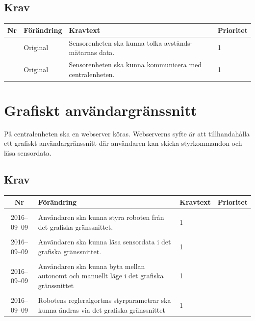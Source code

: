 \documentclass[a4paper,titlepage,12pt]{article}
\newcounter{reqNr}
\newcommand{\nextReqNr}{\stepcounter{reqNr}\arabic{reqNr}}
\newcounter{reqNrII}
\newcommand{\nextReqNrII}{\stepcounter{reqNrII}\arabic{reqNrII}}
\newcommand{\newRequirement}[1] {\pbox{5cm}{Tillagt \\#1}}
\begin{document}
	\subsection{Krav}
	\begin{longtable}[c]{ c l>{\raggedright}p{} l }
		\textbf{Nr} & \textbf{Förändring} & \textbf{Kravtext} & \textbf{Prioritet} 
			\\ \midrule

		\nextReqNr{} & Original & Sensorenheten ska kunna tolka avstånds- mätarnas data. & 1
			\\ \midrule

		\nextReqNr{} & Original & Sensorenheten ska kunna kommunicera med 
			centralenheten. & 1

	\end{longtable}

    \section{Grafiskt användargränssnitt}
    På centralenheten ska en webserver köras. Webserverns syfte är att
    tillhandahålla ett grafiskt användargränssnitt där användaren kan skicka
    styrkommandon och läsa sensordata.
	\subsection{Krav}
	\begin{longtable}[c]{ c l>{\raggedright}p{} l }
		\textbf{Nr} & \textbf{Förändring} & \textbf{Kravtext} & \textbf{Prioritet} 
		\\ \midrule

		\nextReqNrII{} & \newRequirement{2016--09--09} & Användaren ska kunna styra roboten från
								  det grafiska gränssnittet. & 1
		\\ \midrule

		\nextReqNrII{} & \newRequirement{2016--09--09} & Användaren ska kunna läsa sensordata i det grafiska gränssnittet. & 1 \\

		\nextReqNrII{} & \newRequirement{2016--09--09} & Användaren ska kunna byta
		mellan autonomt och manuellt läge i det grafiska gränssnittet & 1
		\\ \midrule

		\nextReqNrII{} & \newRequirement{2016--09--09} & Robotens regleralgortms styrparametrar
			ska kunna ändras via det grafiska gränssnittet& 1
			\\ \midrule

	\end{longtable}
\end{document}
